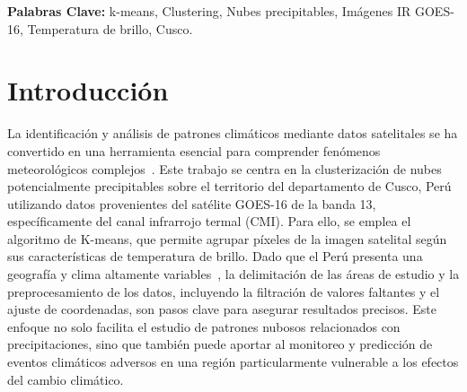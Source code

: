\documentclass[twocolumn]{IECEjournal} %
\begin{document}
\author[1]{Araujo R., Robert}
\author[2]{Rivera F., Alexis}
\author[3]{Salinas J., Allen}


\ifproof

\fi

\maketitle


\noindent \textbf{Palabras Clave:} k-means, Clustering, Nubes precipitables, Imágenes IR GOES-16, Temperatura de brillo, Cusco.
\citationblock

\section{Introducción}
La identificación y análisis de patrones climáticos mediante datos satelitales se ha convertido en una herramienta esencial para comprender fenómenos meteorológicos complejos~\cite{1}. Este trabajo se centra en la clusterización de nubes potencialmente precipitables sobre el territorio del departamento de Cusco, Perú utilizando datos provenientes del satélite GOES-16 de la banda 13, específicamente del canal infrarrojo termal (CMI). Para ello, se emplea el algoritmo de K-means, que permite agrupar píxeles de la imagen satelital según sus características de temperatura de brillo. Dado que el Perú presenta una geografía y clima altamente variables~\cite{2}, la delimitación de las áreas de estudio y la preprocesamiento de los datos, incluyendo la filtración de valores faltantes y el ajuste de coordenadas, son pasos clave para asegurar resultados precisos. Este enfoque no solo facilita el estudio de patrones nubosos relacionados con precipitaciones, sino que también puede aportar al monitoreo y predicción de eventos climáticos adversos en una región particularmente vulnerable a los efectos del cambio climático.
\end{document}
